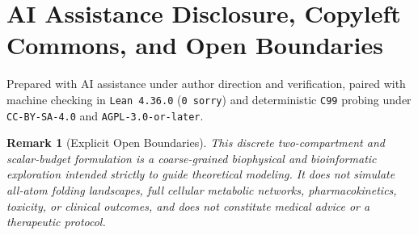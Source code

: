 \documentclass[11pt,a4paper]{article}
\newtheorem{remark}{Remark}
\begin{document}
\section*{AI Assistance Disclosure, Copyleft Commons, and Open Boundaries}
Prepared with AI assistance under author direction and verification, paired with machine checking in \texttt{Lean~4.36.0} (\texttt{0~sorry}) and deterministic \texttt{C99} probing under \texttt{CC-BY-SA-4.0} and \texttt{AGPL-3.0-or-later}.

\begin{remark}[Explicit Open Boundaries]
This discrete two-compartment and scalar-budget formulation is a coarse-grained biophysical and bioinformatic exploration intended strictly to guide theoretical modeling. It does not simulate all-atom folding landscapes, full cellular metabolic networks, pharmacokinetics, toxicity, or clinical outcomes, and does not constitute medical advice or a therapeutic protocol.
\end{remark}
\end{document}
